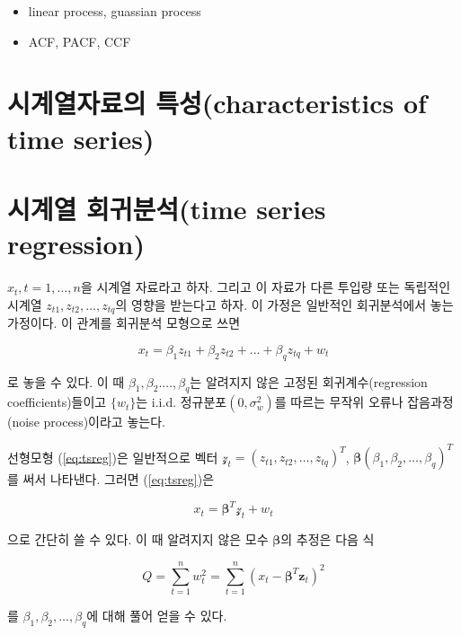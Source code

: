 \documentclass[b5paper,]{book}
\theoremstyle{definition}
\theoremstyle{definition}
\theoremstyle{definition}
\theoremstyle{remark}
\begin{document}
\begin{itemize}
\item
  linear process, guassian process
\item
  ACF, PACF, CCF
\end{itemize}

\section{시계열자료의 특성(characteristics of time
series)}\label{-characteristics-of-time-series}

\section{시계열 회귀분석(time series
regression)}\label{-time-series-regression}

\(x_{t},t=1,\ldots ,n\)을 시계열 자료라고 하자. 그리고 이 자료가 다른
투입량 또는 독립적인 시계열 \(z_{t1}, z_{t2}, \ldots ,z_{tq}\)의 영향을
받는다고 하자. 이 가정은 일반적인 회귀분석에서 놓는 가정이다. 이 관계를
회귀분석 모형으로 쓰면

\begin{equation}\label{eq:tsreg}
x_{t}=\beta_{1}z_{t1}+\beta_{2}z_{t2}+\ldots + \beta_{q}z_{tq}+w_{t}
\end{equation}

로 놓을 수 있다. 이 때 \(\beta_{1},\beta_{2}.\ldots , \beta_{q}\)는
알려지지 않은 고정된 회귀계수(regression coefficients)들이고
\(\{ w_{t}\}\)는 i.i.d. 정규분포\((0,\sigma_{w}^{2})\)를 따르는 무작위
오류나 잡음과정(noise process)이라고 놓는다.

선형모형 (\eqref{eq:tsreg})은 일반적으로 벡터
\(\mathcal{z}_{t}=(z_{t1},z_{t2},\ldots , z_{tq})^{T}\),
\(\boldsymbol{\beta}(\beta_{1},\beta_{2},\ldots ,\beta_{q})^{T}\)를 써서
나타낸다. 그러면 (\eqref{eq:tsreg})은

\begin{equation}\label{eq:tsregvec}
x_{t}=\boldsymbol{\beta}^{T}\mathcal{z}_{t}+w_{t}
\end{equation}

으로 간단히 쓸 수 있다. 이 때 알려지지 않은 모수
\(\boldsymbol{\beta}\)의 추정은 다음 식

\begin{equation}\label{eq:tsss}
Q=\sum_{t=1}^{n}w_{t}^{2}=\sum_{t=1}^{n}(x_{t}-\boldsymbol{\beta}^{T}\mathbf{z}_{t})^{2}
\end{equation}

를 \(\beta_{1},\beta_{2},\ldots ,\beta_{q}\)에 대해 풀어 얻을 수 있다.
\end{document}
